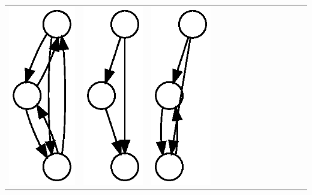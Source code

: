 \begin{table}[t!]
\begin{tabular}{l|lllllllllllll}
    \includegraphics[height=0.03\textheight]{M4-plain} &
    \includegraphics[height=0.03\textheight]{M5-plain} &
    \includegraphics[height=0.03\textheight]{M6-plain} &

\end{tabular}
\end{table}
